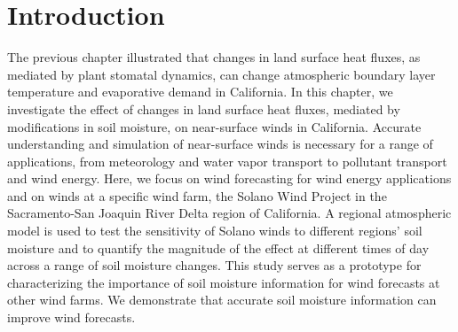 
%
%
%
%
%

\section{Introduction}

The previous chapter illustrated that changes in land surface heat fluxes, as mediated by plant stomatal dynamics, can change atmospheric boundary layer temperature and evaporative demand in California.  In this chapter, we investigate the effect of changes in land surface heat fluxes, mediated by modifications in soil moisture, on near-surface winds in California.  Accurate understanding and simulation of near-surface winds is necessary for a range of applications, from meteorology and water vapor transport to pollutant transport and wind energy.  Here, we focus on wind forecasting for wind energy applications and on winds at a specific wind farm, the Solano Wind Project in the Sacramento-San Joaquin River Delta region of California.  A regional atmospheric model is used to test the sensitivity of Solano winds to different regions' soil moisture and to quantify the magnitude of the effect at different times of day across a range of soil moisture changes.  This study serves as a prototype for characterizing the importance of soil moisture information for wind forecasts at other wind farms.  We demonstrate that accurate soil moisture information can improve wind forecasts.

